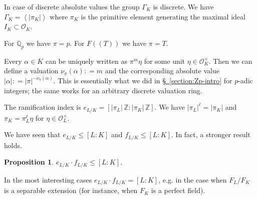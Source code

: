 \documentclass{article}
\newcommand{\dfn}{\mathrel{\mathop:}=}
\newcommand{\ZZ}{\mathbb{Z}}
\newcommand{\QQ}{\mathbb{Q}}
\renewcommand{\O}{\mathcal{O}}
\newcommand{\refref}[2]{\hyperref[#2]{#1~\ref*{#2}}}
\newcommand{\examplesymbol}{$\blacktriangle$}
\renewcommand{\qedsymbol}{$\blacksquare$}
\theoremstyle{myplain}
\newtheorem{proposition}{Proposition}[section]
\theoremstyle{mydefinition}
\newenvironment{example}
  {\pushQED{\qed}\renewcommand{\qedsymbol}{\examplesymbol}\examplex}
  {\popQED\endexamplex}
\begin{document}
In case of discrete absolute values the group $\Gamma_K$ is discrete. We have
$\Gamma_K = \left< |\pi_K| \right>$ where $\pi_K$ is the primitive element
generating the maximal ideal $I_K \subset \O_K$.

\begin{example}
  For $\QQ_p$ we have $\pi = p$. For $F (\!(T)\!)$ we have $\pi = T$.
\end{example}

Every $\alpha \in K$ can be uniquely written as $\pi^m \eta$ for some unit
$\eta \in \O_K^\times$. Then we can define a valuation $\nu_\pi (\alpha) \dfn m$
and the corresponding absolute value $|\alpha| \dfn |\pi|^{-\nu_\pi
  (\alpha)}$. This is essentially what we did in \refref{\S}{section:Zp-intro}
for $p$-adic integers; the same works for an arbitrary discrete valuation ring.

The ramification index is $e_{L/K} = [|\pi_L|\,\ZZ : |\pi_K|\,\ZZ]$. We have
$|\pi_L|^\ell = |\pi_K|$ and $\pi_K = \pi_L^\ell \eta$ for
$\eta \in \O_L^\times$.

\vspace{1em}

We have seen that $e_{L/K} \le [L : K]$ and $f_{L/K} \le [L : K]$. In fact,
a stronger result holds.

\begin{proposition}
  $e_{L/K} \cdot f_{L/K} \le [L : K]$.
\end{proposition}

In the most interesting cases $e_{L/K} \cdot f_{L/K} = [L : K]$, e.g. in the
case when $F_L/F_K$ is a separable extension (for instance, when $F_K$ is a
perfect field).
\end{document}
